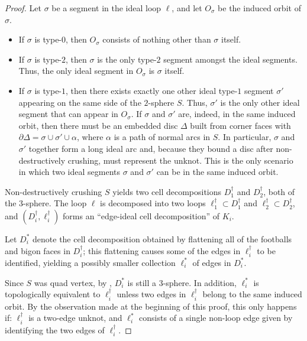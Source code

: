 \documentclass[10pt,a4paper]{amsart}
\begin{document}
\begin{proof}
Let $\sigma$ be a segment in the ideal loop $\ell$, and let $O_\sigma$ be the induced orbit of $\sigma$.
\begin{itemize}
    \item If $\sigma$ is type-$0$, then $O_{\sigma}$ consists of nothing other than $\sigma$ itself.
    \item If $\sigma$ is type-$2$, then $\sigma$ is the
    only type-$2$ segment amongst the ideal segments.
    Thus, the only ideal segment in $O_{\sigma}$ is $\sigma$ itself.
    \item If $\sigma$ is type-$1$, then there exists exactly one other ideal type-$1$ segment $\sigma'$ appearing on the same side of the $2$-sphere $S$.
    Thus, $\sigma'$ is the only other ideal segment that can appear in $O_{\sigma}$. If $\sigma$ and $\sigma'$ are, indeed, in the same induced orbit, then there must be an embedded disc $\Delta$ built from corner faces with $\partial\Delta = \sigma \cup \sigma' \cup \alpha$, where $\alpha$ is a path of normal arcs in $S$. In particular, $\sigma$ and $\sigma'$ together form a long ideal arc and, because they bound a disc after non-destructively crushing, must represent the unknot. This is the only scenario in which two ideal segments $\sigma$ and $\sigma'$ can be in the same induced orbit.
\end{itemize}

Non-destructively crushing $S$ yields two cell decompositions $D_1^\dagger$ and $D_2^\dagger$, both of the $3$-sphere. The loop $\ell$ is decomposed into two loops $\ell_1^\dagger \subset D_1^\dagger$ and $\ell_2^\dagger \subset D_2^\dagger$,
and $(D_i^\dagger, \ell_i^\dagger)$ forms an ``edge-ideal cell decomposition'' of $K_i$.

Let $D_i^\ast$ denote the cell decomposition obtained by flattening all of the footballs and bigon faces in $D_i^\dagger$; this flattening causes some of the edges in $\ell_i^\dagger$ to be identified, yielding a possibly smaller collection $\ell_i^\ast$ of edges in $D_i^\ast$.

Since $S$ was quad vertex, by , $D_i^\ast$ is still a $3$-sphere. In addition, $\ell_i^\ast$ is topologically equivalent to $\ell_i^\dagger$ unless two edges in $\ell_i^\dagger$ belong to the same induced orbit.
By the observation made at the beginning of this proof, this only happens if: $\ell_i^\dagger$ is a two-edge unknot, and $\ell_i^\ast$ consists of a single non-loop edge given by identifying the two edges of $\ell_i^\dagger$.


\end{proof}
\end{document}
